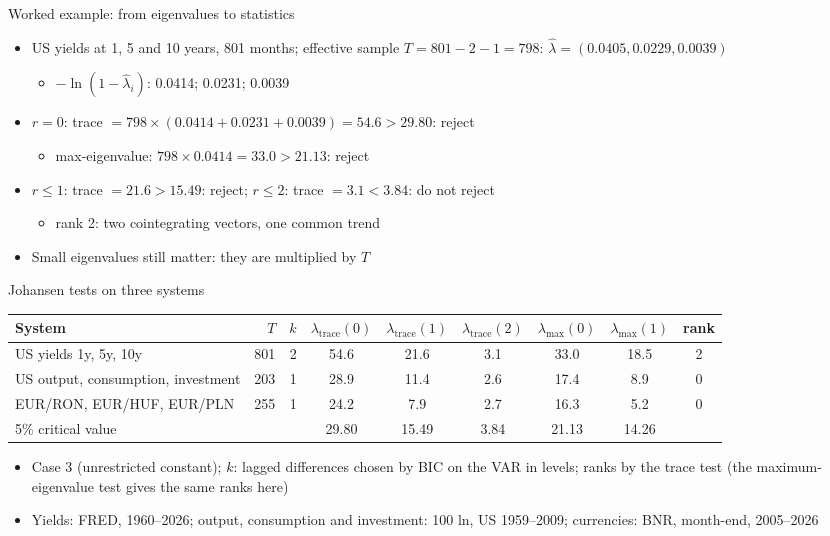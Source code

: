\begin{frame}{Worked example: from eigenvalues to statistics}
\itemsize{\small}
\begin{itemize}
    \item US yields at 1, 5 and 10 years, 801 months; effective sample $T = 801 - 2 - 1 = 798$: $\hat\lambda = (0.0405, 0.0229, 0.0039)$
    \begin{itemize}
        \item $-\ln(1 - \hat\lambda_i)$: 0.0414; 0.0231; 0.0039
    \end{itemize}
    \item $r = 0$: trace $= 798 \times (0.0414 + 0.0231 + 0.0039) = 54.6 > 29.80$: reject
    \begin{itemize}
        \item max-eigenvalue: $798 \times 0.0414 = 33.0 > 21.13$: reject
    \end{itemize}
    \item $r \le 1$: trace $= 21.6 > 15.49$: reject; \quad $r \le 2$: trace $= 3.1 < 3.84$: do not reject
    \begin{itemize}
        \item rank 2: two cointegrating vectors, one common trend
    \end{itemize}
    \item Small eigenvalues still matter: they are multiplied by $T$
\end{itemize}
\end{frame}

\begin{frame}{Johansen tests on three systems}
\itemsize{\small}
\begin{center}
\scriptsize
\begin{tabular}{lrrcccccc}
\toprule
\textbf{System} & $T$ & $k$ & $\lambda_{\mathrm{trace}}(0)$ & $\lambda_{\mathrm{trace}}(1)$ & $\lambda_{\mathrm{trace}}(2)$ & $\lambda_{\max}(0)$ & $\lambda_{\max}(1)$ & \textbf{rank} \\
\midrule
US yields 1y, 5y, 10y & 801 & 2 & 54.6 & 21.6 & 3.1 & 33.0 & 18.5 & 2 \\
US output, consumption, investment & 203 & 1 & 28.9 & 11.4 & 2.6 & 17.4 & 8.9 & 0 \\
EUR/RON, EUR/HUF, EUR/PLN & 255 & 1 & 24.2 & 7.9 & 2.7 & 16.3 & 5.2 & 0 \\
5\% critical value & & & 29.80 & 15.49 & 3.84 & 21.13 & 14.26 & \\
\bottomrule
\end{tabular}
\end{center}
\begin{itemize}
    \item Case 3 (unrestricted constant); $k$: lagged differences chosen by BIC on the VAR in levels; ranks by the trace test (the maximum-eigenvalue test gives the same ranks here)
    \item Yields: FRED, 1960--2026; output, consumption and investment: 100 ln, US 1959--2009; currencies: BNR, month-end, 2005--2026
\end{itemize}
\end{frame}

